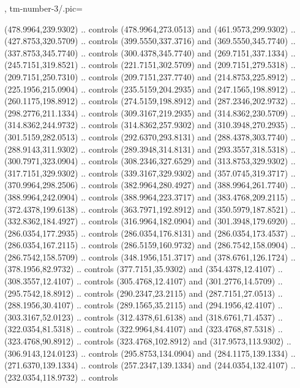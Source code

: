 {{  },
  tm-number-3/.pic={
    \begin{scope}[y=-0.80pt,x=0.80pt,scale=0.04,yshift=135pt,xshift=-280pt]
       (478.9964,239.9302) .. controls
      (478.9964,273.0513) and (461.9573,299.9302) .. (427.8753,320.5709) .. controls
      (399.5550,337.3716) and (369.5550,345.7740) .. (337.8753,345.7740) .. controls
      (300.4378,345.7740) and (269.7151,337.1334) .. (245.7151,319.8521) .. controls
      (221.7151,302.5709) and (209.7151,279.5318) .. (209.7151,250.7310) .. controls
      (209.7151,237.7740) and (214.8753,225.8912) .. (225.1956,215.0904) .. controls
      (235.5159,204.2935) and (247.1565,198.8912) .. (260.1175,198.8912) .. controls
      (274.5159,198.8912) and (287.2346,202.9732) .. (298.2776,211.1334) .. controls
      (309.3167,219.2935) and (314.8362,230.5709) .. (314.8362,244.9732) .. controls
      (314.8362,257.9302) and (310.3948,270.2935) .. (301.5159,282.0513) .. controls
      (292.6370,293.8131) and (288.4378,303.7740) .. (288.9143,311.9302) .. controls
      (289.3948,314.8131) and (293.3557,318.5318) .. (300.7971,323.0904) .. controls
      (308.2346,327.6529) and (313.8753,329.9302) .. (317.7151,329.9302) .. controls
      (339.3167,329.9302) and (357.0745,319.3717) .. (370.9964,298.2506) .. controls
      (382.9964,280.4927) and (388.9964,261.7740) .. (388.9964,242.0904) .. controls
      (388.9964,223.3717) and (383.4768,209.2115) .. (372.4378,199.6138) .. controls
      (363.7971,192.8912) and (350.5979,187.8521) .. (332.8362,184.4927) .. controls
      (316.9964,182.0904) and (301.3948,179.6920) .. (286.0354,177.2935) .. controls
      (286.0354,176.8131) and (286.0354,173.4537) .. (286.0354,167.2115) .. controls
      (286.5159,160.9732) and (286.7542,158.0904) .. (286.7542,158.5709) .. controls
      (348.1956,151.3717) and (378.6761,126.1724) .. (378.1956,82.9732) .. controls
      (377.7151,35.9302) and (354.4378,12.4107) .. (308.3557,12.4107) .. controls
      (305.4768,12.4107) and (301.2776,14.5709) .. (295.7542,18.8912) .. controls
      (290.2347,23.2115) and (287.7151,27.0513) .. (288.1956,30.4107) .. controls
      (289.1565,35.2115) and (294.1956,42.4107) .. (303.3167,52.0123) .. controls
      (312.4378,61.6138) and (318.6761,71.4537) .. (322.0354,81.5318) .. controls
      (322.9964,84.4107) and (323.4768,87.5318) .. (323.4768,90.8912) .. controls
      (323.4768,102.8912) and (317.9573,113.9302) .. (306.9143,124.0123) .. controls
      (295.8753,134.0904) and (284.1175,139.1334) .. (271.6370,139.1334) .. controls
      (257.2347,139.1334) and (244.0354,132.4107) .. (232.0354,118.9732) .. controls

\end{scope}}}
